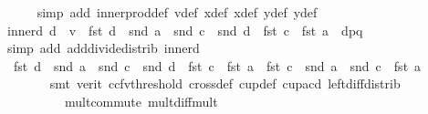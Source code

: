 \begin{isabellebody}
\ \ \ \ \isamarkupfalse%
\ {\isacharparenleft}{\kern0pt}simp\ add{\isacharcolon}{\kern0pt}\ inner{\isacharunderscore}{\kern0pt}prod{\isacharunderscore}{\kern0pt}def\ v{\isacharunderscore}{\kern0pt}def\ x{}{\isacharunderscore}{\kern0pt}def\ x{}{\isacharunderscore}{\kern0pt}def\ y{}{\isacharunderscore}{\kern0pt}def\ y{}{\isacharunderscore}{\kern0pt}def{\isacharparenright}{\kern0pt}\isanewline
\ \ \isamarkupfalse%
\ inner{\isacharunderscore}{\kern0pt}d{}{\isacharcolon}{\kern0pt}\ {\isachardoublequoteopen}d\ {\isasymbullet}\ v\ {\isacharequal}{\kern0pt}\ {\isacharparenleft}{\kern0pt}fst\ d\ {\isacharasterisk}{\kern0pt}\ {\isacharparenleft}{\kern0pt}snd\ a\ {\isacharminus}{\kern0pt}\ snd\ c{\isacharparenright}{\kern0pt}\ {\isacharplus}{\kern0pt}\ snd\ d\ {\isacharasterisk}{\kern0pt}\ {\isacharparenleft}{\kern0pt}fst\ c\ {\isacharminus}{\kern0pt}\ fst\ a{\isacharparenright}{\kern0pt}{\isacharparenright}{\kern0pt}\ {\isacharslash}{\kern0pt}\ dpq{\isachardoublequoteclose}\isanewline
\ \ \ \ \isamarkupfalse%
\ {\isacharparenleft}{\kern0pt}simp\ add{\isacharcolon}{\kern0pt}\ add{\isacharunderscore}{\kern0pt}divide{\isacharunderscore}{\kern0pt}distrib\ inner{\isacharunderscore}{\kern0pt}d{}{\isacharparenright}{\kern0pt}\isanewline
\ \ \isamarkupfalse%
\ {}{\isacharcolon}{\kern0pt}\ {\isachardoublequoteopen}fst\ d\ {\isacharasterisk}{\kern0pt}\ {\isacharparenleft}{\kern0pt}snd\ a\ {\isacharminus}{\kern0pt}\ snd\ c{\isacharparenright}{\kern0pt}\ {\isacharplus}{\kern0pt}\ snd\ d\ {\isacharasterisk}{\kern0pt}\ {\isacharparenleft}{\kern0pt}fst\ c\ {\isacharminus}{\kern0pt}\ fst\ a{\isacharparenright}{\kern0pt}\ {\isachargreater}{\kern0pt}\ fst\ c\ {\isacharasterisk}{\kern0pt}\ snd\ a\ {\isacharminus}{\kern0pt}\ snd\ c\ {\isacharasterisk}{\kern0pt}\ fst\ a{\isachardoublequoteclose}\isanewline
\ \ \ \ \ \ \isamarkupfalse%
\ {\isacharparenleft}{\kern0pt}smt\ {\isacharparenleft}{\kern0pt}verit{\isacharcomma}{\kern0pt}\ ccfv{\isacharunderscore}{\kern0pt}threshold{\isacharparenright}{\kern0pt}\ cross{}{\isacharunderscore}{\kern0pt}def\ cup{}{\isacharunderscore}{\kern0pt}def\ cup{\isacharunderscore}{\kern0pt}acd\ left{\isacharunderscore}{\kern0pt}diff{\isacharunderscore}{\kern0pt}distrib\isanewline
\ \ \ \ \ \ \ \ \ \ mult{\isachardot}{\kern0pt}commute\ mult{\isacharunderscore}{\kern0pt}diff{\isacharunderscore}{\kern0pt}mult{\isacharparenright}{\kern0pt}\isanewline
\ \ \isamarkupfalse%

\end{isabellebody}
